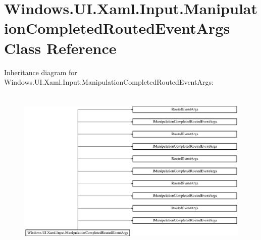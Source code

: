 \hypertarget{class_windows_1_1_u_i_1_1_xaml_1_1_input_1_1_manipulation_completed_routed_event_args}{}\section{Windows.\+U\+I.\+Xaml.\+Input.\+Manipulation\+Completed\+Routed\+Event\+Args Class Reference}
\label{class_windows_1_1_u_i_1_1_xaml_1_1_input_1_1_manipulation_completed_routed_event_args}
Inheritance diagram for Windows.\+U\+I.\+Xaml.\+Input.\+Manipulation\+Completed\+Routed\+Event\+Args\+:\begin{figure}[H]
\begin{center}
\leavevmode
\includegraphics[height=8.083990cm]{class_windows_1_1_u_i_1_1_xaml_1_1_input_1_1_manipulation_completed_routed_event_args}
\end{center}
\end{figure}
